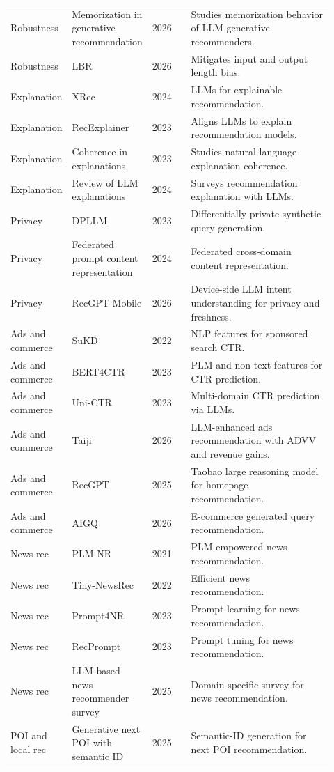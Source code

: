 \documentclass[11pt]{article}
\begin{document}
\begin{longtable}{@{}p{0.13\linewidth}p{0.23\linewidth}p{0.12\linewidth}p{0.44\linewidth}@{}}
Robustness & Memorization in generative recommendation & 2026 & Studies memorization behavior of LLM generative recommenders.\\
Robustness & LBR & 2026 & Mitigates input and output length bias.\\
Explanation & XRec & 2024 & LLMs for explainable recommendation.\\
Explanation & RecExplainer & 2023 & Aligns LLMs to explain recommendation models.\\
Explanation & Coherence in explanations & 2023 & Studies natural-language explanation coherence.\\
Explanation & Review of LLM explanations & 2024 & Surveys recommendation explanation with LLMs.\\
Privacy & DPLLM & 2023 & Differentially private synthetic query generation.\\
Privacy & Federated prompt content representation & 2024 & Federated cross-domain content representation.\\
Privacy & RecGPT-Mobile & 2026 & Device-side LLM intent understanding for privacy and freshness.\\
Ads and commerce & SuKD & 2022 & NLP features for sponsored search CTR.\\
Ads and commerce & BERT4CTR & 2023 & PLM and non-text features for CTR prediction.\\
Ads and commerce & Uni-CTR & 2023 & Multi-domain CTR prediction via LLMs.\\
Ads and commerce & Taiji & 2026 & LLM-enhanced ads recommendation with ADVV and revenue gains.\\
Ads and commerce & RecGPT & 2025 & Taobao large reasoning model for homepage recommendation.\\
Ads and commerce & AIGQ & 2026 & E-commerce generated query recommendation.\\
News rec & PLM-NR & 2021 & PLM-empowered news recommendation.\\
News rec & Tiny-NewsRec & 2022 & Efficient news recommendation.\\
News rec & Prompt4NR & 2023 & Prompt learning for news recommendation.\\
News rec & RecPrompt & 2023 & Prompt tuning for news recommendation.\\
News rec & LLM-based news recommender survey & 2025 & Domain-specific survey for news recommendation.\\
POI and local rec & Generative next POI with semantic ID & 2025 & Semantic-ID generation for next POI recommendation.\\

\end{longtable}
\end{document}
